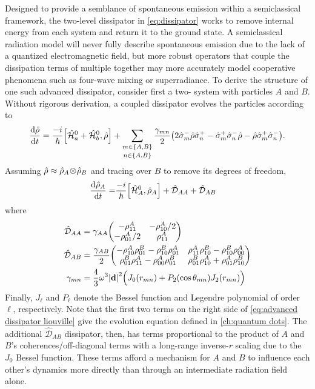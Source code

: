 Designed to provide a semblance of spontaneous emission within a semiclassical framework, the two-level dissipator in \cref{eq:dissipator} works to remove internal energy from each \qd{} system and return it to the ground state.
A semiclassical radiation model will never fully describe spontaneous emission due to the lack of a quantized electromagnetic field, but more robust operators that couple the dissipation terms of multiple \qds{} together may more accurately model cooperative phenomena such as four-wave mixing or superradiance. 
To derive the structure of one such advanced dissipator, consider first a two-\qd{} system with particles $A$ and $B$.
Without rigorous derivation, a coupled dissipator evolves the particles according to
\begin{equation}
  \dv{\hat{\rho}}{t} = \frac{-i}{\hbar} \commutator{\hat{\mathcal{H}}_a^0 + \hat{\mathcal{H}}_b^0}{\hat{\rho}} + \sum_{\shortstack{$\scriptstyle m \in \qty{A, B}$\\$\scriptstyle n \in \qty{A, B}$}} \frac{\gamma_{mn}}{2} \qty(2 \hat{\sigma}_m^- \hat{\rho} \hat{\sigma}_n^+ - \hat{\sigma}_m^+ \hat{\sigma}_n^- \hat{\rho} - \hat{\rho} \hat{\sigma}_m^+ \hat{\sigma}_n^-).
\end{equation}
Assuming $\hat{\rho} \approx \hat{\rho}_A \! \otimes \! \hat{\rho}_B$ and tracing over $B$ to remove its degrees of freedom,
\begin{equation}
  \begin{aligned}
    \dv{\hat{\rho}_A}{t} =& \frac{-i}{\hbar} \commutator{\hat{\mathcal{H}}_A^0}{\hat{\rho}_A} + \hat{\mathcal{D}}_{AA} + \hat{\mathcal{D}}_{AB}
  \end{aligned}
  \label{eq:advanced dissipator liouville}
\end{equation}
where
\begin{subequations}
  \begin{align}
    \hat{\mathcal{D}}_{AA} &= \gamma_{AA} \mqty(-\rho_{11}^A & -\rho_{10}^A/2 \\ -\rho_{01}^A/2 & \rho_{11}^A) \\
    \hat{\mathcal{D}}_{AB} &= \frac{\gamma_{AB}}{2} \mqty(-\rho_{10}^A\rho_{01}^B - \rho_{10}^B \rho_{01}^A & \rho_{11}^A\rho_{10}^B - \rho_{10}^B\rho_{00}^A \\ \rho_{01}^B\rho_{11}^A - \rho_{00}^A\rho_{01}^B & \rho_{01}^B \rho_{10}^A + \rho_{01}^A \rho_{10}^B) \\
    \gamma_{mn} &= \frac{4}{3}\omega^3 \abs{\vb{d}}^2 \qty\Big(J_0(r_{mn}) + P_2(\cos \theta_{mn}) J_2(r_{mn}))
  \end{align}
  \label{eq:cross matrices}
\end{subequations}
Finally, $J_\ell$ and $P_\ell$ denote the Bessel function and Legendre polynomial of order $\ell$, respectively.
Note that the first two terms on the right side of \cref{eq:advanced dissipator liouville} give the evolution equation defined in \cref{ch:quantum dots}.
The additional $\hat{\mathcal{D}}_{AB}$ dissipator, then, has terms proportional to the product of $A$ and $B$'s coherences/off-diagonal terms with a long-range inverse-$r$ scaling due to the $J_0$ Bessel function.
These terms afford a mechanism for $A$ and $B$ to influence each other's dynamics more directly than through an intermediate radiation field alone.

